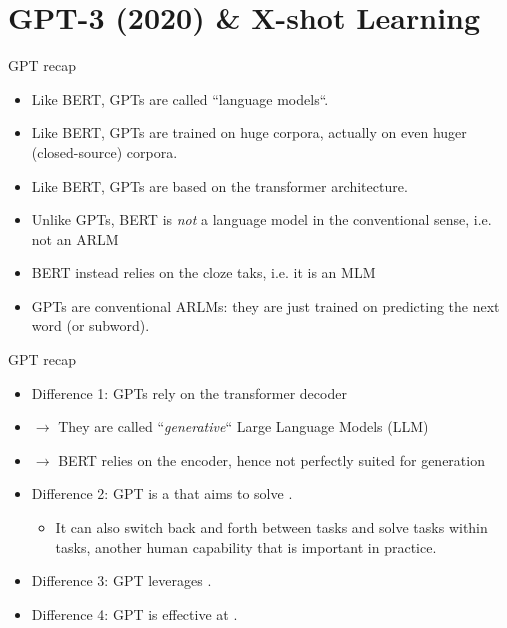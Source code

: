 

\section{GPT-3 (2020) \& X-shot Learning}

\begin{frame}{GPT recap}

\vfill

  \begin{itemize}
\item Like BERT, GPTs are called ``language models``.
\item Like BERT, GPTs are trained on huge corpora, actually on even huger (closed-source) corpora.
\item Like BERT, GPTs are based on the transformer architecture.
\item Unlike GPTs, BERT is \textit{not} a language model in the conventional sense, i.e. not an ARLM
\item BERT instead relies on the cloze taks, i.e. it is an MLM
\item GPTs are conventional ARLMs: they are just trained on predicting the next word (or subword).
    \end{itemize}

\vfill

\end{frame}


\begin{frame}{GPT recap}

\vfill

  \begin{itemize}
\item Difference 1: GPTs rely on the transformer decoder
\item[] $\to$ They are called ``\textit{generative}`` Large Language Models (LLM)
\item[] $\to$ BERT relies on the encoder, hence not perfectly suited for generation
\item Difference 2: GPT is a  that aims to solve .  
  \begin{itemize}
    \item It can also switch back and forth between tasks and solve
    tasks within tasks, another human capability that is
    important in practice. 
    \end{itemize}
\item Difference 3: GPT leverages .
\item Difference 4: GPT is effective at .
    \end{itemize}

\vfill

\end{frame}

